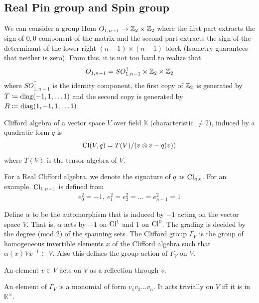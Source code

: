 \documentclass[a4paper,11pt]{article}
\begin{document}
\begin{appendices}
\section{Real Pin group and Spin group}
We can consider a group Hom $O_{1,n-1} \to \mathbb{Z}_2\times \mathbb{Z}_2$ where the first part extracts the sign of $0,0$ component of the matrix and the second part extracts the sign of the determinant of the lower right $(n-1) \times (n-1)$ block (Isometry guarantees that neither is zero). From this, it is not too hard to realize that 
\begin{align*}
    O_{1,n-1} = SO^{\uparrow}_{1,n-1}\times \mathbb{Z}_2 \times \mathbb{Z}_2     
\end{align*}
where $SO^{\uparrow}_{1,n-1}$ is the identity component, the first copy of $\mathbb{Z}_2$ is generated by $T \coloneqq {\rm diag}(-1,1,\dots 1)$ and the second copy is generated by $R \coloneqq {\rm diag}(1,-1, 1, \dots 1)$. 

\begin{definition}
    Clifford algebra of a vector space $V$ over field ${\mathbb K}$ (characteristic $\neq 2$), induced by a quadratic form $q$ is 
    \begin{equation}
        {\rm Cl}(V,q)=T(V)/(v\otimes v -q(v)) 
    \end{equation}
    where $T(V)$ is the tensor algebra of $V$. 
\end{definition}
For a Real Clifford algebra, we denote the signature of $q$ as ${\rm Cl}_{a,b}$. For an example, ${\rm Cl}_{1,n-1}$ is defined from 
\begin{align*}
    e_0^2=-1, ~ e_1^2=e_2^2=\dots =e_{n-1}^2=1    
\end{align*}

\begin{definition}
    Define $\alpha$ to be the automorphism that is induced by ${-1}$ acting on the vector space $V$. That is, $\alpha$ acts by ${-1}$ on ${\rm Cl}^{1}$ and $1$ on ${\rm Cl}^{0}$. The grading is decided by the degree (mod 2) of the spanning sets. The Clifford group $\Gamma_V$ is the group of homogeneous invertible elements $x$ of the Clifford algebra such that $\alpha(x)Vx^{-1}\subset V$. Also this defines the group action of $\Gamma_V$ on $V$. 
\end{definition}
\begin{remark}
    An element $v \in V$ acts on $V$ as a reflection through $v$. 
\end{remark}
\begin{remark}
    An element of $\Gamma_V$ is a monomial of form $v_1v_2\dots v_n$. It acts trivially on $V$ iff it is in ${\mathbb K}^{\times}$. 
\end{remark}


\end{appendices}
\end{document}
